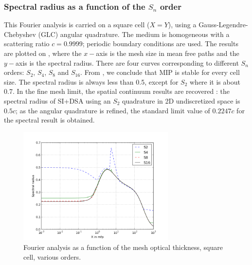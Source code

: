 \subsubsection{Spectral radius as a function of the $S_n$ order}

This Fourier analysis is carried on a square cell ($X=Y$), using a
Gauss-Legendre-Chebyshev (GLC) angular quadrature. The medium is homogeneous with a 
scattering ratio $c=0.9999$; periodic boundary conditions are used. The results 
are plotted on , where the $x-$axis is the mesh size in mean free 
paths and the $y-$axis is the spectral radius. There are four curves corresponding 
to different $S_n$ orders: $S_2$, $S_4$, $S_8$ and $S_{16}$.
From , we conclude that MIP is stable for every 
cell size. The spectral radius is always less than 0.5, except for $S_2$ where 
it is about 0.7. In the fine mesh limit, the spatial continuum results are recovered \cite{multisweep}:
the spectral radius of SI+DSA using an $S_2$ quadrature in 2D undiscretized space is $0.5c$; as the angular 
quadrature is refined, the standard limit value of $0.2247c$ for the spectral result is obtained.
\begin{figure}[!htbp]
  \centering
  \includegraphics[width=0.7\textwidth]{sn_order_9999}
  \caption{Fourier analysis as a function of the mesh optical thickness, square cell,
    various \sn orders.}
  \label{fig_fa_sn}
\end{figure}

